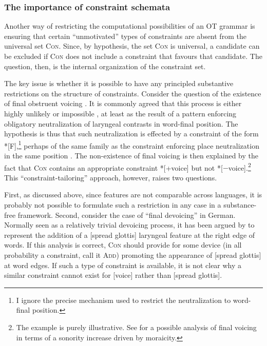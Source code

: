 \subsubsection{The importance of constraint schemata}
\label{sec:import-constr-schem}

Another way of restricting the computational possibilities of an OT grammar is ensuring that certain \enquote{unmotivated} types of constraints are absent from the universal set \textsc{Con}. Since, by hypothesis, the set \textsc{Con} is universal, a candidate can be excluded if \textsc{Con} does not include a constraint that favours that candidate. The question, then, is the internal organization of the constraint set.

The key issue is whether it is possible to have any principled substantive restrictions on the structure of constraints. Consider the question of the existence of final obstruent voicing \citep{yu04:_explain_final_obstr_voicin_lezgian,blevins,delacy2006,kiparsky06:_amphic_progr,kiparsky08:_univer}. It is commonly agreed that this process is either highly unlikely \citep{yu04:_explain_final_obstr_voicin_lezgian,blevins} or impossible \citep{kiparsky08:_univer}, at least as the result of a pattern enforcing obligatory neutralization of laryngeal contrasts in word\hyp final position. The hypothesis is thus that such neutralization is effected by a constraint of the form *[F],\footnote{I ignore the precise mechanism used to restrict the neutralization to word\hyp final position.} perhaps of the same family as the constraint enforcing place neutralization in the same position \citep[although see][]{lombardi01:_why_place_voice}. The non\hyp existence of final voicing is then explained by the fact that \textsc{Con} contains an appropriate constraint *[+voice] but not *[$-$voice].\footnote{The example is purely illustrative. See \citet{delacy2006} for a possible analysis of final voicing in terms of a sonority increase driven by moraicity.} This \enquote{constraint\hyp tailoring} approach, however, raises two questions.

First, as discussed above, since features are not comparable across languages, it is probably not possible to formulate such a restriction in any case in a substance\hyp free framework. Second, consider the case of \enquote{final devoicing} in German. Normally seen as a relatively trivial devoicing process, it has been argued by \citet[\emph{et passim}]{iverson07:_domain_and_direc_in_evolut} to represent the addition of a [spread glottis] laryngeal feature at the right edge of words. If this analysis is correct, \textsc{Con} should provide for some device (in all probability a constraint, call it \textsc{Add}) promoting the appearance of [spread glottis] at word edges. If such a type of constraint is available, it is not clear why a similar constraint cannot exist for [voice] rather than [spread glottis].


